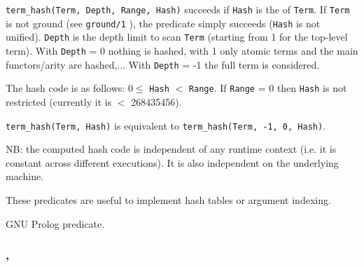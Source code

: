\Description

\texttt{term\_hash(Term, Depth, Range, Hash)} succeeds if \texttt{Hash} is
the  of \texttt{Term}. If \texttt{Term} is not ground (see
\texttt{ground/1} ), the predicate simply succeeds
(\texttt{Hash} is not unified). \texttt{Depth} is the depth limit to scan
\texttt{Term} (starting from 1 for the top-level term). With \texttt{Depth} =
0 nothing is hashed, with 1 only atomic terms and the main functors/arity are
hashed,... With \texttt{Depth} = -1 the full term is considered.

The hash code is as follows: $0 \leq$ \texttt{Hash} $<$ \texttt{Range}. If \texttt{Range} = 0 then
\texttt{Hash} is not restricted (currently it is $<$ 268435456).

\texttt{term\_hash(Term, Hash)} is equivalent to \texttt{term\_hash(Term, -1, 0, Hash)}.

NB: the computed hash code is independent of any runtime context (i.e. it is
constant across different executions). It is also independent on the
underlying machine.

These predicates are useful to implement hash tables or argument indexing.

\begin{PlErrors}







\end{PlErrors}

\Portability

GNU Prolog predicate.

\subsubsection{,
               }

